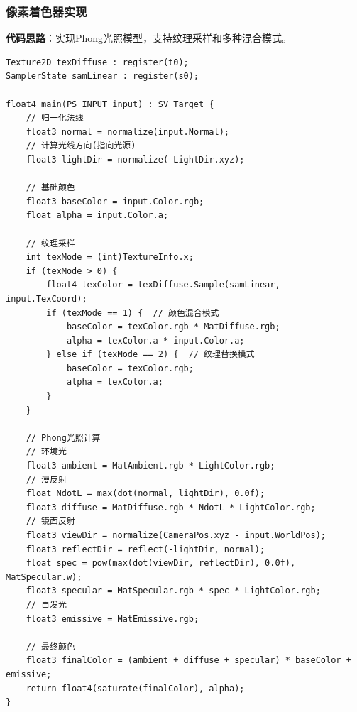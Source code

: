 \documentclass[12pt,a4paper]{article}
\begin{document}
\begin{tcolorbox}
\subsubsection{像素着色器实现}

\textbf{代码思路}：实现Phong光照模型，支持纹理采样和多种混合模式。

\begin{lstlisting}[caption={HLSL像素着色器}]
Texture2D texDiffuse : register(t0);
SamplerState samLinear : register(s0);

float4 main(PS_INPUT input) : SV_Target {
    // 归一化法线
    float3 normal = normalize(input.Normal);
    // 计算光线方向(指向光源)
    float3 lightDir = normalize(-LightDir.xyz);
    
    // 基础颜色
    float3 baseColor = input.Color.rgb;
    float alpha = input.Color.a;
    
    // 纹理采样
    int texMode = (int)TextureInfo.x;
    if (texMode > 0) {
        float4 texColor = texDiffuse.Sample(samLinear, input.TexCoord);
        if (texMode == 1) {  // 颜色混合模式
            baseColor = texColor.rgb * MatDiffuse.rgb;
            alpha = texColor.a * input.Color.a;
        } else if (texMode == 2) {  // 纹理替换模式
            baseColor = texColor.rgb;
            alpha = texColor.a;
        }
    }
    
    // Phong光照计算
    // 环境光
    float3 ambient = MatAmbient.rgb * LightColor.rgb;
    // 漫反射
    float NdotL = max(dot(normal, lightDir), 0.0f);
    float3 diffuse = MatDiffuse.rgb * NdotL * LightColor.rgb;
    // 镜面反射
    float3 viewDir = normalize(CameraPos.xyz - input.WorldPos);
    float3 reflectDir = reflect(-lightDir, normal);
    float spec = pow(max(dot(viewDir, reflectDir), 0.0f), MatSpecular.w);
    float3 specular = MatSpecular.rgb * spec * LightColor.rgb;
    // 自发光
    float3 emissive = MatEmissive.rgb;
    
    // 最终颜色
    float3 finalColor = (ambient + diffuse + specular) * baseColor + emissive;
    return float4(saturate(finalColor), alpha);
}
\end{lstlisting}
\end{tcolorbox}
\end{document}
